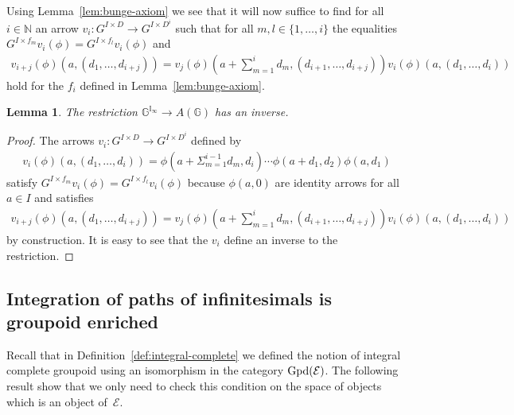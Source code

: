 \documentclass[10pt,a4paper]{amsart}
\numberwithin{equation}{section}
\newtheorem{Lemma}[Theorem]{Lemma}
\begin{document}
Using Lemma~\ref{lem:bunge-axiom} we see that it will now suf\/f\/ice to f\/ind for all $i\in \mathbb{N}$ an arrow $v_i\colon G^{I\times D} \rightarrow G^{I\times D^i}$ such that for all $m,l\in \{1,\dots ,i\}$ the equalities $G^{I\times f_m}v_i(\phi)=G^{I\times f_l}v_i(\phi)$ and \begin{gather*}
v_{i+j}(\phi)(a,(d_1,\dots,d_{i+j}))=v_j(\phi)\left(a+\sum_{m=1}^{i} d_m,(d_{i+1},\dots,d_{i+j})\right)v_i(\phi)(a,(d_1,\dots,d_i))
\end{gather*} hold for the $f_i$ def\/ined in Lemma~\ref{lem:bunge-axiom}.

\begin{Lemma} The restriction $\mathbb{G}^{\mathbb{I}_{\infty}} \rightarrow A(\mathbb{G})$ has an inverse.
\end{Lemma}
 \begin{proof}
The arrows $v_i\colon G^{I\times D} \rightarrow G^{I\times D^i}$ def\/ined by
 \begin{gather*}v_i(\phi)(a,(d_1,\dots,d_i))=\phi(a+\Sigma_{m=1}^{i-1} d_m,d_i)\cdots \phi(a+d_1,d_2)\phi(a,d_1) \end{gather*}
satisfy $G^{I\times f_m}v_i(\phi)=G^{I\times f_l}v_i(\phi)$ because $\phi(a,0)$ are identity arrows for all $a\in I$ and satisf\/ies
\begin{gather*}
v_{i+j}(\phi)(a,(d_1,\dots,d_{i+j}))=v_j(\phi)\left(a+\sum_{m=1}^{i} d_m,(d_{i+1},\dots,d_{i+j})\right)v_i(\phi)(a,(d_1,\dots,d_i))
\end{gather*} by construction. It is easy to see that the $v_i$ def\/ine an inverse to the restriction.
 \end{proof}

\subsection{Integration of paths of inf\/initesimals is groupoid enriched}

Recall that in Def\/inition~\ref{def:integral-complete} we def\/ined the notion of integral complete groupoid using an isomorphism in the category ${\rm Gpd}(\mathcal{E})$. The following result show that we only need to check this condition on the space of objects which is an object of~$\mathcal{E}$.
\end{document}
